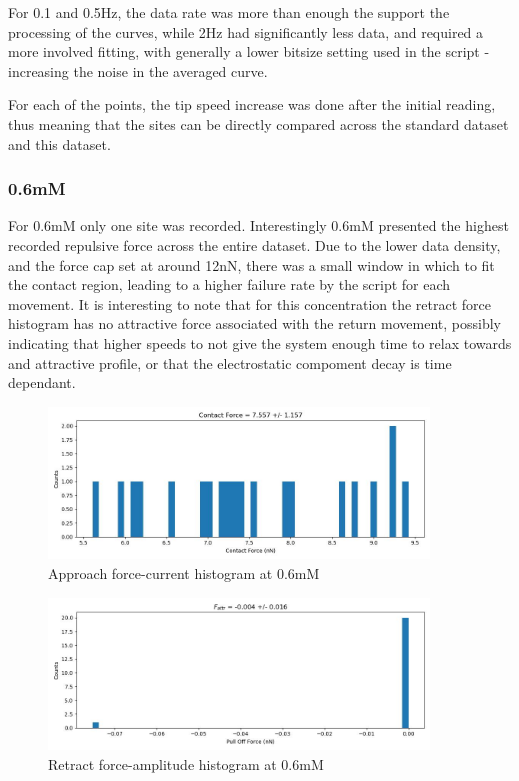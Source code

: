 For 0.1 and 0.5Hz, the data rate was more than enough the support the processing of the curves, while 2Hz had significantly less data, and required a more involved fitting, with generally a lower bitsize setting used in the script - increasing the noise in the averaged curve.

For each of the points, the tip speed increase was done after the initial reading, thus meaning that the sites can be directly compared across the standard dataset and this dataset.

\subsubsection*{0.6mM}
For 0.6mM only one site was recorded. Interestingly 0.6mM presented the highest recorded repulsive force across the entire dataset. Due to the lower data density, and the force cap set at around 12nN, there was a small window in which to fit the contact region, leading to a higher failure rate by the script for each movement. It is interesting to note that for this concentration the retract force histogram has no attractive force associated with the return movement, possibly indicating that higher speeds to not give the system enough time to relax towards and attractive profile, or that the electrostatic compoment decay is time dependant.
\begin{figure}[h!]
\centering
\includegraphics[width=0.9\textwidth]{chapter7/Tip speed/0.6mM/approach_f_c_hist.jpg}
\caption{Approach force-current histogram at 0.6mM}
\end{figure}

\begin{figure}[h!]
\centering
\includegraphics[width=0.9\textwidth]{chapter7/Tip speed/0.6mM/retract_f_a_hist.jpg}
\caption{Retract force-amplitude histogram at 0.6mM}
\end{figure}


